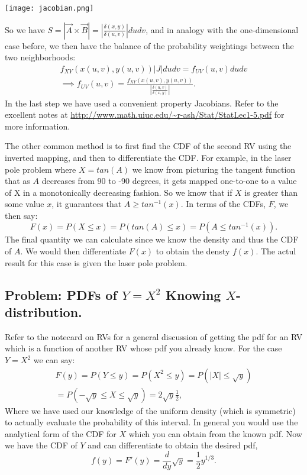 \texttt{[image: jacobian.png]}

So we have $S = |\vec{A}\times\vec{B}| = |\frac{\delta(x,y)}{\delta(u,v)}|dudv$, and in analogy with the one-dimensional case before, we then have the balance of the probability weightings between the two neighborhoods: 
\begin{align*}
f_{XY}(x(u,v),y(u,v))|J|dudv = f_{UV}(u,v)dudv \\
\implies f_{UV}(u,v) = \frac{f_{XY}(x(u,v),y(u,v))}{|\frac{\delta(u,v)}{\delta(x,y)}|}.
\end{align*}
In the last step we have used a convenient property Jacobians. Refer to the excellent notes at \url{http://www.math.uiuc.edu/~r-ash/Stat/StatLec1-5.pdf} for more information. 
\n
 
The other common method is to first find the CDF of the second RV using the inverted mapping, and then to differentiate the CDF.  For example, in the laser pole problem where $X=tan(A)$ we know from picturing the tangent function that as $A$ decreases from 90 to -90 degrees, it gets mapped one-to-one to a value of X in a monotonically decreasing fashion. So we know that if $X$ is greater than some value $x$, it guarantees that $A \geq tan^{-1}(x)$. In terms of the CDFs, $F$, we then say:
\begin{equation}
F(x) = P(X \leq x) = P(tan(A) \leq x) = P(A \leq tan^{-1}(x)).
\end{equation}
The final quantity we can calculate since we know the density and thus the CDF of $A$. We would then differentiate $F(x)$ to obtain the densty $f(x)$. The actul result for this case is given the laser pole problem. 
\n


\subsection{Problem: PDFs of $Y=X^2$ Knowing $X$-distribution.}
Refer to the notecard on RVs for a general discussion of getting the pdf for an RV which is a function of another RV whose pdf you already know. For the case $Y=X^2$ we can say:
\begin{align*}
F(y) = P(Y \leq y) = P(X^2 \leq y) = P(|X| \leq \sqrt y) \\
= P( -\sqrt y \leq X \leq \sqrt y)=2\sqrt{y}  \frac{1}{2},
\end{align*}
Where we have used our knowledge of the uniform density (which is symmetric) to actually evaluate the probability of this interval. In general you would use the analytical form of the CDF for $X$ which you can obtain from the known pdf. Now we have the CDF of $Y$ and can differentiate to obtain the desired pdf,
\begin{equation}
f(y) = F'(y) = \frac{d}{dy}\sqrt{y}=\frac{1}{2}y^{1/3}.
\end{equation}



